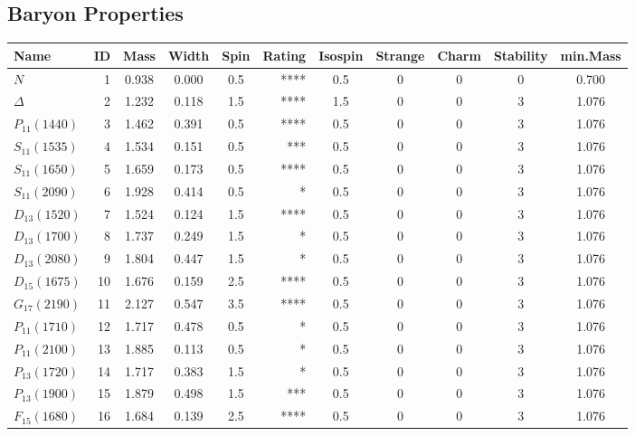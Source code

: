 \documentclass[a4paper,10pt]{article}
\begin{document}
\subsection{Baryon Properties}
\begin{tabular}{|lr|cccrccccc|} 
\hline
\textbf{Name}&\textbf{ID}&\textbf{Mass}&\textbf{Width}&\textbf{Spin}&\textbf{Rating}&
\textbf{Isospin}&\textbf{Strange}&\textbf{Charm}&\textbf{Stability}&\textbf{min.Mass} \\
\hline
$N             $ &   1&  0.938&  0.000 &  0.5 &  ****&      0.5&       0&       0&       0& 0.700\\
$\Delta        $ &   2&  1.232&  0.118 &  1.5 &  ****&      1.5&       0&       0&       3& 1.076\\
$P_{11}(1440)  $ &   3&  1.462&  0.391 &  0.5 &  ****&      0.5&       0&       0&       3& 1.076\\
$S_{11}(1535)  $ &   4&  1.534&  0.151 &  0.5 &   ***&      0.5&       0&       0&       3& 1.076\\
$S_{11}(1650)  $ &   5&  1.659&  0.173 &  0.5 &  ****&      0.5&       0&       0&       3& 1.076\\
$S_{11}(2090)  $ &   6&  1.928&  0.414 &  0.5 &     *&      0.5&       0&       0&       3& 1.076\\
$D_{13}(1520)  $ &   7&  1.524&  0.124 &  1.5 &  ****&      0.5&       0&       0&       3& 1.076\\
$D_{13}(1700)  $ &   8&  1.737&  0.249 &  1.5 &     *&      0.5&       0&       0&       3& 1.076\\
$D_{13}(2080)  $ &   9&  1.804&  0.447 &  1.5 &     *&      0.5&       0&       0&       3& 1.076\\
$D_{15}(1675)  $ &  10&  1.676&  0.159 &  2.5 &  ****&      0.5&       0&       0&       3& 1.076\\
$G_{17}(2190)  $ &  11&  2.127&  0.547 &  3.5 &  ****&      0.5&       0&       0&       3& 1.076\\
$P_{11}(1710)  $ &  12&  1.717&  0.478 &  0.5 &     *&      0.5&       0&       0&       3& 1.076\\
$P_{11}(2100)  $ &  13&  1.885&  0.113 &  0.5 &     *&      0.5&       0&       0&       3& 1.076\\
$P_{13}(1720)  $ &  14&  1.717&  0.383 &  1.5 &     *&      0.5&       0&       0&       3& 1.076\\
$P_{13}(1900)  $ &  15&  1.879&  0.498 &  1.5 &   ***&      0.5&       0&       0&       3& 1.076\\
$F_{15}(1680)  $ &  16&  1.684&  0.139 &  2.5 &  ****&      0.5&       0&       0&       3& 1.076\\

\end{tabular}
\end{document}

